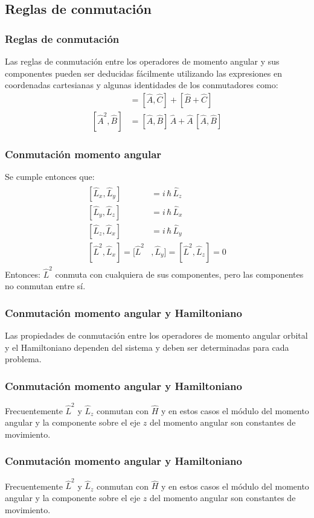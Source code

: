 \subsection{Reglas de conmutación}
\begin{frame}
\frametitle{Reglas de conmutación}
Las reglas de conmutación entre los operadores de momento angular y sus componentes pueden ser deducidas fácilmente utilizando las expresiones en coordenadas cartesianas y algunas identidades de los conmutadores como:
\begin{align*}
[ \hat{A} + \hat{B}, \hat{C}] &= [\hat{A}, \hat{C}] + [\hat{B} + \hat{C}] \\[0.5em]
[ \hat{A}^{2} , \hat{B}] &= [\hat{A}, \hat{B}] \, \hat{A} +  \hat{A} \, [\hat{A} , \hat{B}]
\end{align*}
\end{frame}
\begin{frame}
\frametitle{Conmutación momento angular}
Se cumple entonces que:
\begin{align}
\begin{aligned}
[ \hat{L}_{x}, \hat{L}_{y} ] &= i \, \hbar \, \hat{L}_{z} \\[0.5em]
[ \hat{L}_{y}, \hat{L}_{z} ] &= i \, \hbar \, \hat{L}_{x} \\[0.5em]
[ \hat{L}_{z}, \hat{L}_{x} ] &= i \, \hbar \, \hat{L}_{y} \\[0.5em]
[\hat{L}^{2}, \hat{L}_{x}] = [\hat{L}^{2}&, \hat{L}_{y}] = [\hat{L}^{2}, \hat{L}_{z}] = 0
\end{aligned}
\label{eq:ecuacion_01_07}
\end{align}
\fontsize{12}{12}\selectfont
Entonces: $\hat{L}^{2}$ conmuta con cualquiera de sus componentes, pero las componentes no conmutan entre sí.
\end{frame}
\begin{frame}
\frametitle{Conmutación momento angular y Hamiltoniano}
Las propiedades de conmutación entre los operadores de momento angular orbital y el Hamiltoniano dependen del sistema y deben ser determinadas para cada problema.
\end{frame}
\begin{frame}
\frametitle{Conmutación momento angular y Hamiltoniano}
Frecuentemente $\hat{L}^{2}$ y $\hat{L}_{z}$ conmutan con $\hat{H}$ y en estos casos el módulo del momento angular y la componente sobre el eje $z$ del momento angular son constantes de movimiento. 
\end{frame}
\begin{frame}
\frametitle{Conmutación momento angular y Hamiltoniano}
Frecuentemente $\hat{L}^{2}$ y $\hat{L}_{z}$ conmutan con $\hat{H}$ y en estos casos el módulo del momento angular y la componente sobre el eje $z$ del momento angular son constantes de movimiento.
\end{frame}
